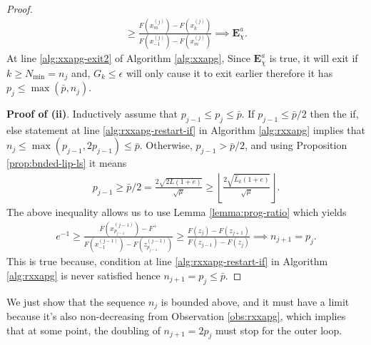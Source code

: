 \documentclass[12pt]{report}
\begin{document}
\begin{proof}
\begin{align*}
{                } 
                \ge 
                \frac{
                    F\left(x_{m}^{(j)}\right)
                    - F\left(x_k^{(j)}\right)
                }{
                    F\left(x_{-1}^{(j)}\right) 
                    - F\left(x_{m}^{(j)}\right)
                } 
                \implies \mathbf E_{\chi}^a. 
            \end{align*}
            At line \ref{alg:xxapg-exit2} of Algorithm \ref{alg:xxapg}, Since $\mathbf E_\chi^a$ is true, it will exit if $k \ge N_{\min} = n_j$ and, $G_k \le \epsilon$ will only cause it to exit earlier therefore it has $p_j \le \max(\bar p, n_j)$. 
            \par
            \textbf{Proof of (ii)}. 
            Inductively assume that $p_{j - 1} \le p_j \le \bar p$. 
            If $p_{j - 1} \le \bar p /2$ then the if, else statement at line \ref{alg:rxxapg-restart-if} in Algorithm \ref{alg:rxxapg} implies that $n_{j} \le \max(p_{j - 1}, 2p_{j - 1}) \le \bar p$. 
            Otherwise, $p_{j - 1} > \bar p/2$, and using Proposition \ref{prop:bnded-lip-ls} it means 
            \begin{align*}
                p_{j - 1} \ge \bar p /2 = \frac{2\sqrt{2L(1 + e)}}{\sqrt{\mu}} 
                \ge 
                \left \lfloor \frac{2\sqrt{\widehat L_k(1 + e)}}{\sqrt{\mu}} \right\rfloor. 
            \end{align*}
            The above inequality allows us to use Lemma \ref{lemma:prog-ratio} which yields 
            \begin{align*}
                e^{-1} \ge 
                \frac{
                    F\left(x_{p_{j - 1}}^{(j - 1)}\right) - F^+
                }
                {
                    F\left(x_{-1}^{(j - 1)}\right) - F\left(z_{p_{j - 1}}^{(j - 1)}\right)
                }
                \ge 
                \frac{F(z_j) - F(z_{j + 1})}
                {F(z_{j - 1}) - F(z_{j})} \implies n_{j + 1} = p_{j}.
            \end{align*}
            This is true because, condition at line \ref{alg:rxxapg-restart-if} in Algorithm \ref{alg:rxxapg} is never satisfied hence $n_{j + 1} = p_j \le \bar p$. 
        \end{proof}
        \par
        We just show that the sequence $n_j$ is bounded above, and it must have a limit because it's also non-decreasing from Observation \ref{obs:rxxapg}, which implies that at some point, the doubling of $n_{j + 1} = 2p_j$ must stop for the outer loop. 
\end{document}

